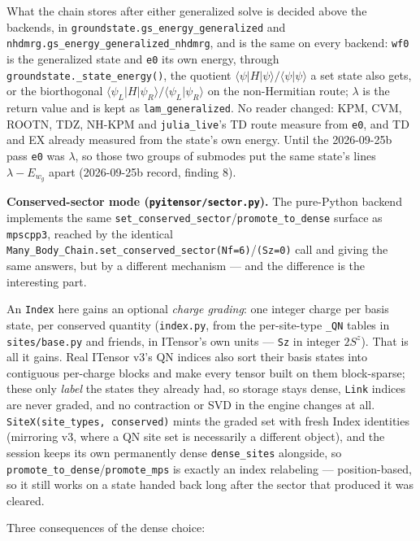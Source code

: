 \documentclass[11pt]{article}
\begin{document}
What the chain stores after either generalized solve is decided above the
backends, in \texttt{groundstate.gs\_energy\_generalized} and
\texttt{nhdmrg.gs\_energy\_generalized\_nhdmrg}, and is the same on every
backend: \texttt{wf0} is the generalized state and \texttt{e0} its own
energy, through \texttt{groundstate.\_state\_energy()}, the quotient
$\langle\psi|H|\psi\rangle/\langle\psi|\psi\rangle$ a set state also gets,
or the biorthogonal
$\langle\psi_L|H|\psi_R\rangle/\langle\psi_L|\psi_R\rangle$ on the
non-Hermitian route; $\lambda$ is the return value and is kept as
\texttt{lam\_generalized}. No reader changed: KPM, CVM, ROOTN, TDZ, NH-KPM
and \texttt{julia\_live}'s TD route measure from \texttt{e0}, and TD and EX
already measured from the state's own energy. Until the 2026-09-25b pass
\texttt{e0} was $\lambda$, so those two groups of submodes put the same
state's lines $\lambda-E_{w_g}$ apart (2026-09-25b record, finding 8).

\textbf{Conserved-sector mode (\texttt{pyitensor/sector.py}).} The
pure-Python backend implements the same
\texttt{set\_conserved\_sector}/\texttt{promote\_to\_dense} surface as
\texttt{mpscpp3}, reached by the identical
\texttt{Many\_Body\_Chain.set\_conserved\_sector(Nf=6)}/\texttt{(Sz=0)}
call and giving the same answers, but by a different mechanism --- and
the difference is the interesting part.

An \texttt{Index} here gains an optional \emph{charge grading}: one
integer charge per basis state, per conserved quantity
(\texttt{index.py}, from the per-site-type \texttt{\_QN} tables in
\texttt{sites/base.py} and friends, in ITensor's own units --- \texttt{Sz}
in integer $2S^z$). That is all it gains. Real ITensor v3's QN indices
also sort their basis states into contiguous per-charge blocks and make
every tensor built on them block-sparse; these only \emph{label} the
states they already had, so storage stays dense, \texttt{Link} indices
are never graded, and no contraction or SVD in the engine changes at all.
\texttt{SiteX(site\_types, conserved)} mints the graded set with fresh
Index identities (mirroring v3, where a QN site set is necessarily a
different object), and the session keeps its own permanently dense
\texttt{dense\_sites} alongside, so
\texttt{promote\_to\_dense}/\texttt{promote\_mps} is exactly an index
relabeling --- position-based, so it still works on a state handed back
long after the sector that produced it was cleared.

Three consequences of the dense choice:
\end{document}
